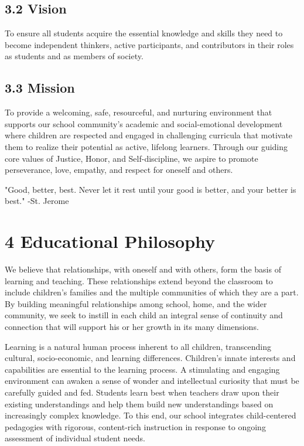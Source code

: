 \documentclass[11pt]{article}
\begin{document}
\subsection{3.2 Vision}
\label{sec:org167b811}

To ensure all students acquire the essential knowledge and skills they need to become independent thinkers, active participants, and contributors in their roles as students and as members of society.

\subsection{3.3 Mission}
\label{sec:orgbf0476c}

To provide a welcoming, safe, resourceful, and nurturing environment that supports our school community’s academic and social-emotional development where children are respected and engaged in challenging curricula that motivate them to realize their potential as active, lifelong learners. Through our guiding core values of Justice, Honor, and Self-discipline, we aspire to promote perseverance, love, empathy, and respect for oneself and others.

"Good, better, best. Never let it rest until your good is better, and your better is best." -St. Jerome
\section{4 Educational Philosophy}
\label{sec:org285b5cd}

We believe that relationships, with oneself and with others, form the basis of learning and teaching. These relationships extend beyond the classroom to include children’s families and the multiple communities of which they are a part. By building meaningful relationships among school, home, and the wider community, we seek to instill in each child an integral sense of continuity and connection that will support his or her growth in its many dimensions.

Learning is a natural human process inherent to all children, transcending cultural, socio-economic, and learning differences. Children’s innate interests and capabilities are essential to the learning process. A stimulating and engaging environment can awaken a sense of wonder and intellectual curiosity that must be carefully guided and fed. Students learn best when teachers draw upon their existing understandings and help them build new understandings based on increasingly complex knowledge. To this end, our school integrates child-centered pedagogies with rigorous, content-rich instruction in response to ongoing assessment of individual student needs.
\end{document}
